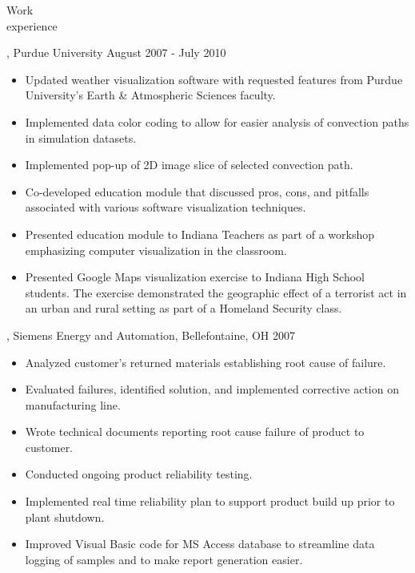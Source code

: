 \begin{category}{Work \\experience}
\begin{itemize}
\end{itemize}




, Purdue University  August 2007 - July 2010 
\begin{itemize}
\item Updated weather visualization software with requested features from Purdue University's Earth \& Atmospheric Sciences faculty.
\item Implemented data color coding to allow for easier analysis of convection paths in simulation datasets.
\item Implemented pop-up of 2D image slice of selected convection path. %
\item Co-developed education module that discussed pros, cons, and pitfalls associated with various software visualization techniques.
\item Presented education module to Indiana Teachers as part of a workshop emphasizing computer visualization in the classroom.
\item Presented Google Maps visualization exercise to Indiana High School students. The exercise demonstrated the geographic effect of a terrorist act in an urban and rural setting as part of a Homeland Security class.
\end{itemize}

, Siemens Energy and Automation, Bellefontaine, OH  2007 
\begin{itemize}
\item Analyzed customer's returned materials establishing root cause of failure.
\item Evaluated failures, identified solution, and implemented corrective action on manufacturing line.
\item Wrote technical documents reporting root cause failure of product to customer.
\item Conducted ongoing product reliability testing.
\item Implemented real time reliability plan to support product build up prior to plant shutdown.
\item Improved Visual Basic code for MS Access database to streamline data logging of samples and to make report generation easier.
\end{itemize}


\end{category}
